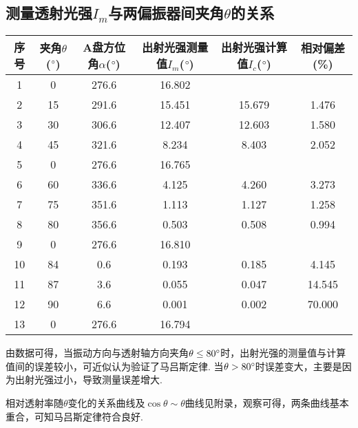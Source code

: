 \documentclass{thureport}
\def\de{{\ensuremath{^\circ\hspace{-0.09em}}}}
\begin{document}
\subsection{测量透射光强$I_m$与两偏振器间夹角$\theta$的关系}
\begin{table}[H]
    \centering
      \begin{tabular}{|c|c|c|c|c|c|}
      \hline
      序号    & 夹角$\theta$(\de) & A盘方位角$\alpha$(\de) & 出射光强测量值$I_m$(\de) & 出射光强计算值$I_c$(\de) & 相对偏差(\%) \bigstrut\\
      \hline
      1     & 0     & 276.6  & 16.802  &       &  \bigstrut\\
      \hline
      2     & 15    & 291.6  & 15.451  & 15.679  & 1.476  \bigstrut\\
      \hline
      3     & 30    & 306.6  & 12.407  & 12.603  & 1.580  \bigstrut\\
      \hline
      4     & 45    & 321.6  & 8.234  & 8.403  & 2.052  \bigstrut\\
      \hline
      5     & 0     & 276.6  & 16.765  &       &  \bigstrut\\
      \hline
      6     & 60    & 336.6  & 4.125  & 4.260  & 3.273  \bigstrut\\
      \hline
      7     & 75    & 351.6  & 1.113  & 1.127  & 1.258  \bigstrut\\
      \hline
      8     & 80    & 356.6  & 0.503  & 0.508  & 0.994  \bigstrut\\
      \hline
      9     & 0     & 276.6  & 16.810  &       &  \bigstrut\\
      \hline
      10    & 84    & 0.6   & 0.193  & 0.185  & 4.145  \bigstrut\\
      \hline
      11    & 87    & 3.6   & 0.055  & 0.047  & 14.545  \bigstrut\\
      \hline
      12    & 90    & 6.6   & 0.001  & 0.002  & 70.000  \bigstrut\\
      \hline
      13    & 0     & 276.6  & 16.794  &       &  \bigstrut\\
      \hline
      \end{tabular}%
    \label{tab:addlabel}%
  \end{table}%

由数据可得，当振动方向与透射轴方向夹角$\theta\le80\de$时，出射光强的测量值与计算值间的误差较小，可近似认为验证了马吕斯定律. 当$\theta>80\de$时误差变大，主要是因为出射光强过小，导致测量误差增大.

相对透射率随$\theta$变化的关系曲线及$\cos\theta\sim\theta$曲线见附录，观察可得，两条曲线基本重合，可知马吕斯定律符合良好.
\end{document}

